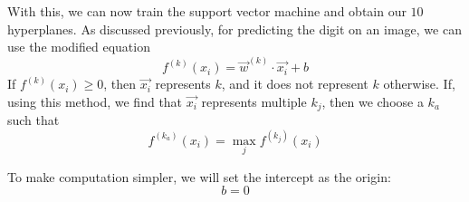 With this, we can now train the support vector machine and obtain our $10$ hyperplanes. As discussed previously, for predicting the digit on an image, we can use the modified equation
\begin{equation}
	f^{(k)}(x_i) = \vec{w}^{(k)}\cdot\vec{x_i} + b
\end{equation}
If $f^{(k)}(x_i) \geq 0$, then $\vec{x_i}$ represents $k$, and it does not represent $k$ otherwise. If, using this method, we find that $\vec{x_i}$ represents multiple $k_j$, then we choose a $k_a$ such that
\begin{equation}
	f^{(k_a)}(x_i) = \max_{j} f^{(k_j)}(x_i)
\end{equation}

To make computation simpler, we will set the intercept as the origin:
\begin{equation}
b = 0
\end{equation}